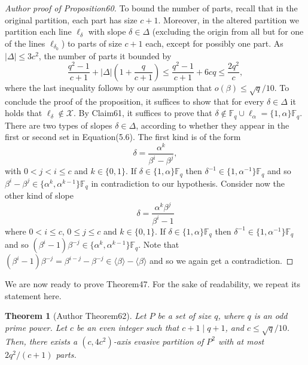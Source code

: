 \documentclass[10pt,a4paper]{article}
\newtheorem{nttheorem}{Theorem}
\begin{document}
\begin{proof}[Author proof of Proposition60]
To bound the number of parts, recall that in the original partition, each part has size $c+1$. Moreover, in the altered partition we partition each line $\ell_\delta$ with slope $\delta\in\Delta$ (excluding the origin from all but for one of the lines $\ell_{\delta_0}$) to parts of size $c+1$ each, except for possibly one part. As $|\Delta|\leq3c^2$, the number of parts it bounded by
\[\frac{q^2-1}{c+1}+|\Delta|\left(1+\frac q{c+1}\right)\leq\frac{q^2-1}{c+1}+6cq\leq\frac{2q^2}c,\]
where the last inequality follows by our assumption that $o(\beta)\leq\sqrt q/10$.
To conclude the proof of the proposition, it suffices to show that for every $\delta\in\Delta$ it holds that $\ell_\delta\notin\mathcal X$. By Claim61, it suffices to prove that $\delta\notin\mathbb F_q\cup\ell_\alpha=\{1,\alpha\}\mathbb F_q$. There are two types of slopes $\delta\in\Delta$, according to whether they appear in the first or second set in Equation(5.6). The first kind is of the form
\[\delta=\frac{\alpha^k}{\beta^i-\beta^j},\]
with $0<j<i\leq c$ and $k\in\{0,1\}$. If $\delta\in\{1,\alpha\}\mathbb F_q$ then $\delta^{-1}\in\{1,\alpha^{-1}\}\mathbb F_q$ and so $\beta^i-\beta^j\in\{\alpha^k,\alpha^{k-1}\}\mathbb F_q$ in contradiction to our hypothesis. Consider now the other kind of slope
\[\delta=\frac{\alpha^k\beta^j}{\beta^i-1}\]
where $0<i\leq c$, $0\leq j\leq c$ and $k\in\{0,1\}$. If $\delta\in\{1,\alpha\}\mathbb F_q$ then $\delta^{-1}\in\{1,\alpha^{-1}\}\mathbb F_q$ and so $(\beta^i-1)\beta^{-j}\in\{\alpha^k,\alpha^{k-1}\}\mathbb F_q$. Note that $(\beta^i-1)\beta^{-j}=\beta^{i-j}-\beta^{-j}\in\langle\beta\rangle-\langle\beta\rangle$ and so we again get a contradiction.
\end{proof}
We are now ready to prove Theorem47. For the sake of readability, we repeat its statement here.
\begin{nttheorem}[Author Theorem62]
Let $P$ be a set of size $q$, where $q$ is an odd prime power. Let $c$ be an even integer such that $c+1\mid q+1$, and $c\leq\sqrt q/10$. Then, there exists a $(c,4c^2)$-axis evasive partition of $P^2$ with at most $2q^2/(c+1)$ parts.
\end{nttheorem}
\end{document}
